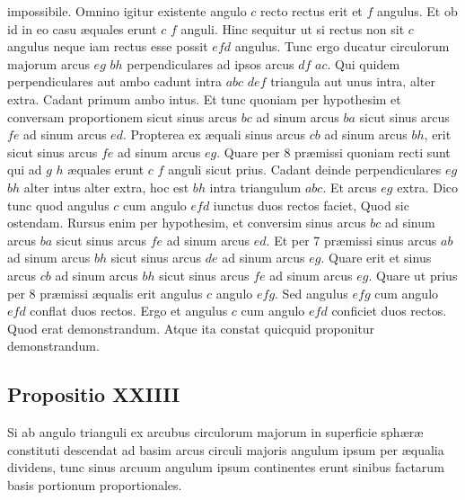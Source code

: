 \documentclass[11pt,a4paper]{article}
\begin{document}
impossibile. Omnino igitur existente angulo $c$ recto rectus erit et
$f$ angulus. Et ob id in eo casu æquales erunt $c$ $f$ anguli. Hinc
sequitur ut si rectus non sit $c$ angulus neque iam rectus esse
possit $efd$ angulus. Tunc ergo ducatur circulorum majorum
arcus $eg$ $bh$ perpendiculares ad ipsos arcus $df$ $ac$. Qui quidem
perpendiculares aut ambo cadunt intra $abc$ $def$ triangula
aut unus intra, alter extra. Cadant primum ambo intus.
Et tunc quoniam per hypothesim et conversam proportionem
sicut sinus arcus $bc$ ad sinum arcus $ba$ sicut sinus arcus $fe$
ad sinum arcus $ed$. Propterea ex æquali sinus arcus $cb$ ad sinum
arcus $bh$, erit sicut sinus arcus $fe$ ad sinum arcus $eg$. Quare per
8 præmissi quoniam recti sunt qui ad $g$ $h$ æquales erunt
$c$ $f$ anguli sicut prius. Cadant deinde perpendiculares $eg$ $bh$
alter intus alter extra, hoc est $bh$ intra triangulum $abc$. Et
arcus $eg$ extra. Dico tunc quod angulus $c$ cum angulo $efd$
iunctus duos rectos faciet, Quod sic ostendam. Rursus enim per
hypothesim, et conversim sinus arcus $bc$ ad sinum arcus $ba$
sicut sinus arcus $fe$ ad sinum arcus $ed$. Et per 7 præmissi sinus
arcus $ab$ ad sinum arcus $bh$ sicut sinus arcus $de$ ad sinum
arcus $eg$. Quare erit et sinus arcus $cb$ ad sinum arcus $bh$ sicut
sinus arcus $fe$ ad sinum arcus $eg$. Quare ut prius per 8 præmissi
æqualis erit angulus $c$ angulo $efg$. Sed angulus $efg$ cum
angulo $efd$ conflat duos rectos. Ergo et angulus $c$ cum
angulo $efd$ conficiet duos rectos. Quod erat demonstrandum.
Atque ita constat quicquid proponitur demonstrandum.

\subsection*{Propositio XXIIII}

Si ab angulo trianguli ex arcubus circulorum majorum
in superficie sphæræ constituti descendat ad basim
arcus circuli majoris angulum ipsum per æqualia dividens,
tunc sinus arcuum angulum ipsum continentes erunt
sinibus factarum basis portionum proportionales.
\end{document}
